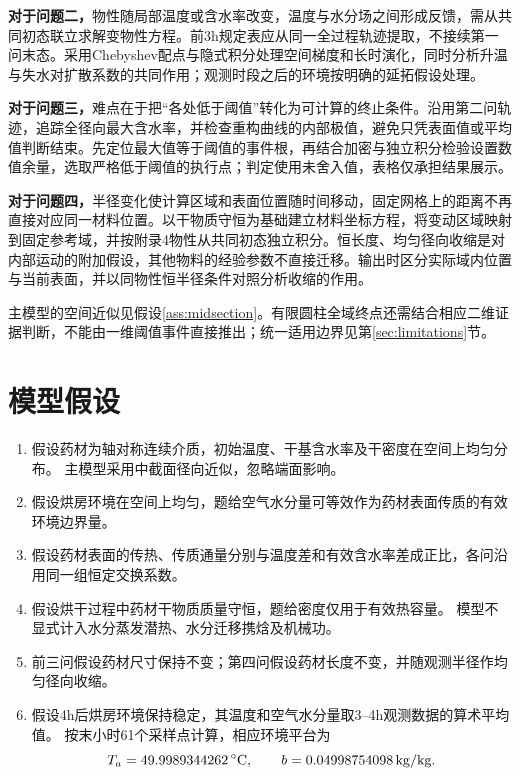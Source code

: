 \textbf{对于问题二，}物性随局部温度或含水率改变，温度与水分场之间形成反馈，需从共同初态联立求解变物性方程。前3\unit{h}规定表应从同一全过程轨迹提取，不接续第一问末态。采用Chebyshev配点与隐式积分处理空间梯度和长时演化，同时分析升温与失水对扩散系数的共同作用；观测时段之后的环境按明确的延拓假设处理。

\textbf{对于问题三，}难点在于把“各处低于阈值”转化为可计算的终止条件。沿用第二问轨迹，追踪全径向最大含水率，并检查重构曲线的内部极值，避免只凭表面值或平均值判断结束。先定位最大值等于阈值的事件根，再结合加密与独立积分检验设置数值余量，选取严格低于阈值的执行点；判定使用未舍入值，表格仅承担结果展示。

\textbf{对于问题四，}半径变化使计算区域和表面位置随时间移动，固定网格上的距离不再直接对应同一材料位置。以干物质守恒为基础建立材料坐标方程，将变动区域映射到固定参考域，并按附录4物性从共同初态独立积分。恒长度、均匀径向收缩是对内部运动的附加假设\cite{adrover2020,wu2022}，其他物料的经验参数不直接迁移。输出时区分实际域内位置与当前表面，并以同物性恒半径条件对照分析收缩的作用。

主模型的空间近似见假设\ref{ass:midsection}。有限圆柱全域终点还需结合相应二维证据判断，不能由一维阈值事件直接推出；统一适用边界见第\ref{sec:limitations}节。

\section{模型假设}
\label{sec:assumptions}
\begin{enumerate}
\item 假设药材为轴对称连续介质，初始温度、干基含水率及干密度在空间上均匀分布。\label{ass:midsection}
主模型采用中截面径向近似，忽略端面影响。
\item 假设烘房环境在空间上均匀，题给空气水分量可等效作为药材表面传质的有效环境边界量。
\item 假设药材表面的传热、传质通量分别与温度差和有效含水率差成正比，各问沿用同一组恒定交换系数。
\item 假设烘干过程中药材干物质质量守恒，题给密度仅用于有效热容量。
模型不显式计入水分蒸发潜热、水分迁移携焓及机械功。
\item 前三问假设药材尺寸保持不变；第四问假设药材长度不变，并随观测半径作均匀径向收缩。
\item 假设4\unit{h}后烘房环境保持稳定，其温度和空气水分量取3--4\unit{h}观测数据的算术平均值。
按末小时61个采样点计算，相应环境平台为
\begin{equation}
T_a=49.9989344262\,{}^\circ\mathrm{C},\qquad b=0.04998754098\,\mathrm{kg/kg}.
\label{eq:future}
\end{equation}
\end{enumerate}

